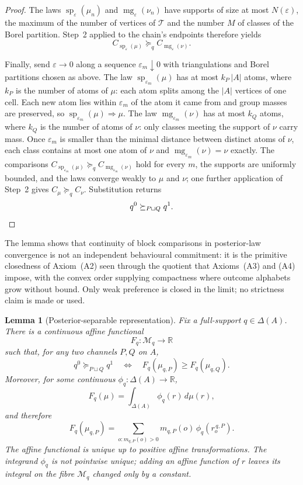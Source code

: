 \documentclass[11pt,a4paper]{article}
\newtheorem{lemma}[theorem]{Lemma}
\theoremstyle{definition}
\newcommand{\R}{\mathbb R}
\newcommand{\1}{\mathbf 1}
\begin{document}
\begin{proof}
The laws $\operatorname{sp}_\varepsilon(\mu_n)$ and $\operatorname{mg}_\varepsilon(\nu_n)$ have supports of size at
most $N(\varepsilon)$, the maximum of the number of vertices of $\mathcal T$ and the number $M$ of classes of the
Borel partition.  Step~2 applied
to the chain's endpoints therefore yields
\[
C_{\operatorname{sp}_\varepsilon(\mu)}
\succeq_q
C_{\operatorname{mg}_\varepsilon(\nu)}.
\]

Finally, send $\varepsilon\to0$ along a sequence $\varepsilon_m\downarrow0$ with triangulations and Borel partitions
chosen as above.  The
law $\operatorname{sp}_{\varepsilon_m}(\mu)$ has at most $k_P\,|A|$ atoms, where $k_P$ is the number of atoms of
$\mu$: each atom splits among the $|A|$ vertices of one cell.  Each new atom lies within $\varepsilon_m$ of the atom
it came from and group masses are preserved, so $\operatorname{sp}_{\varepsilon_m}(\mu)\Rightarrow\mu$.  The law
$\operatorname{mg}_{\varepsilon_m}(\nu)$ has at most $k_Q$ atoms, where $k_Q$ is the number of atoms of $\nu$: only
classes meeting the support of $\nu$ carry mass.  Once $\varepsilon_m$ is smaller than the minimal distance between
distinct atoms of $\nu$, each class contains at most one atom of $\nu$ and
$\operatorname{mg}_{\varepsilon_m}(\nu)=\nu$ exactly.  The comparisons
$C_{\operatorname{sp}_{\varepsilon_m}(\mu)}\succeq_q C_{\operatorname{mg}_{\varepsilon_m}(\nu)}$ hold for every $m$,
the supports are uniformly bounded, and the laws converge weakly to $\mu$ and $\nu$; one further application of
Step~2 gives $C_\mu\succeq_q C_\nu$.  Substitution returns
\[
q^0\succeq_{P\sqcup Q}q^1.
\qedhere
\]
\end{proof}

The lemma shows that continuity of block comparisons in posterior-law convergence is not an independent behavioural
commitment: it is the primitive closedness of Axiom~\textup{(A2)} seen through the quotient that
Axioms~\textup{(A3)} and \textup{(A4)} impose, with the convex order supplying compactness where outcome alphabets
grow without bound.  Only weak preference is closed in the limit; no strictness claim is made or used.

\begin{lemma}[Posterior-separable representation]\label{lem:postsep}
Fix a full-support $q\in\Delta(A)$.  There is a continuous affine functional
\[
F_q:\mathcal M_q\to\R
\]
such that, for any two channels $P,Q$ on $A$,
\[
q^0\succeq_{P\sqcup Q}q^1
\quad\Longleftrightarrow\quad
F_q(\mu_{q,P})\ge F_q(\mu_{q,Q}).
\]
Moreover, for some continuous $\phi_q:\Delta(A)\to\R$,
\[
F_q(\mu)=\int_{\Delta(A)}\phi_q(r)\,d\mu(r),
\]
and therefore
\[
F_q(\mu_{q,P})
=
\sum_{o:m_{q,P}(o)>0}m_{q,P}(o)\,\phi_q(r_o^{\,q,P}).
\]
The affine functional is unique up to positive affine transformations.  The integrand $\phi_q$ is not pointwise unique;
adding an affine function of $r$ leaves its integral on the fibre $\mathcal M_q$ changed only by a constant.
\end{lemma}
\end{document}
